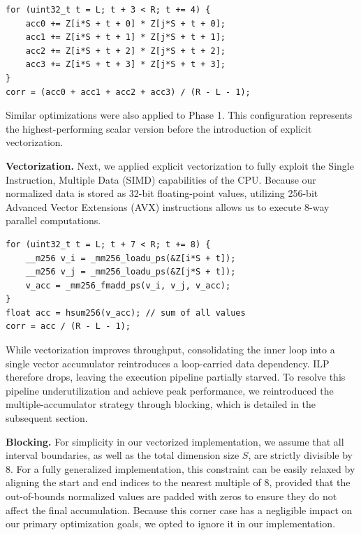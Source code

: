 \documentclass[letterpaper]{article}
\newcommand{\mypar}[1]{{\bf #1.}}
\begin{document}
{\fontsize{8}{10}\selectfont
\begin{Verbatim}
for (uint32_t t = L; t + 3 < R; t += 4) {
    acc0 += Z[i*S + t + 0] * Z[j*S + t + 0];
    acc1 += Z[i*S + t + 1] * Z[j*S + t + 1];
    acc2 += Z[i*S + t + 2] * Z[j*S + t + 2];
    acc3 += Z[i*S + t + 3] * Z[j*S + t + 3];
}
corr = (acc0 + acc1 + acc2 + acc3) / (R - L - 1);
\end{Verbatim}
}

Similar optimizations were also applied to Phase 1.
This configuration represents the highest-performing scalar version before the introduction of explicit vectorization.

\mypar{Vectorization}
Next, we applied explicit vectorization to fully exploit the Single Instruction, Multiple Data (SIMD) capabilities of the CPU.
Because our normalized data is stored as 32-bit floating-point values, utilizing 256-bit Advanced Vector Extensions (AVX) instructions allows us to execute 8-way parallel computations.

{\fontsize{8}{10}\selectfont
\begin{Verbatim}
for (uint32_t t = L; t + 7 < R; t += 8) {
    __m256 v_i = _mm256_loadu_ps(&Z[i*S + t]);
    __m256 v_j = _mm256_loadu_ps(&Z[j*S + t]);
    v_acc = _mm256_fmadd_ps(v_i, v_j, v_acc);
}
float acc = hsum256(v_acc); // sum of all values
corr = acc / (R - L - 1);
\end{Verbatim}
}

While vectorization improves throughput, consolidating the inner loop into a single vector accumulator reintroduces a loop-carried data dependency.
ILP therefore drops, leaving the execution pipeline partially starved.
To resolve this pipeline underutilization and achieve peak performance, we reintroduced the multiple-accumulator strategy through blocking, which is detailed in the subsequent section.


\mypar{Blocking}
For simplicity in our vectorized implementation, we assume that all interval boundaries, as well as the total dimension size $S$, are strictly divisible by 8.
For a fully generalized implementation, this constraint can be easily relaxed by aligning the start and end indices to the nearest multiple of 8, provided that the out-of-bounds normalized values are padded with zeros to ensure they do not affect the final accumulation.
Because this corner case has a negligible impact on our primary optimization goals, we opted to ignore it in our implementation.
\end{document}
